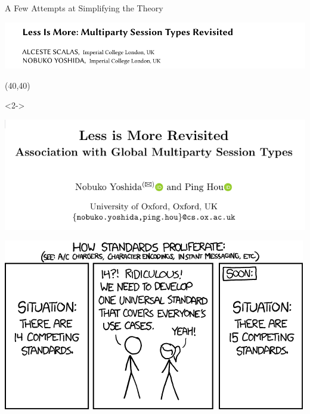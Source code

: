 \begin{frame}{A Few Attempts at Simplifying the Theory}

    \begin{minipage}{.86\columnwidth}
    \begin{sticky}
  \includegraphics[width=\textwidth]{figures/less-is-more.pdf}
    \end{sticky}
    \end{minipage}

  \Put(40,40){%
    \begin{onlyenv}<2->
    \begin{minipage}{.86\columnwidth}
    \begin{sticky}
  \includegraphics[width=\textwidth]{figures/less-is-more-revisite.pdf}
    \end{sticky}
    \end{minipage}
    \end{onlyenv}
   }

\end{frame}

\begin{frame}
  \includegraphics[width=\columnwidth]{figures/xkcd-standards.png}
\end{frame}


